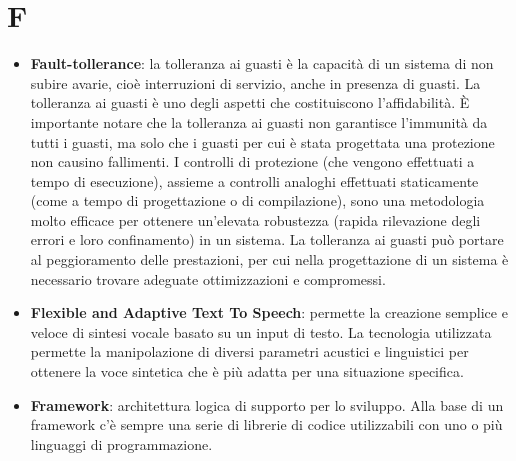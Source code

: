 \section{F}
\begin{itemize} 
	\item
	\textbf{Fault-tollerance}: la tolleranza ai guasti è la capacità di un sistema di non subire avarie, cioè interruzioni di servizio, anche in presenza di guasti. La tolleranza ai guasti è uno degli aspetti che costituiscono l'affidabilità. È importante notare che la tolleranza ai guasti non garantisce l'immunità da tutti i guasti, ma solo che i guasti per cui è stata progettata una protezione non causino fallimenti.
	I controlli di protezione (che vengono effettuati a tempo di esecuzione), assieme a controlli analoghi effettuati staticamente (come a tempo di progettazione o di compilazione), sono una metodologia molto efficace per ottenere un'elevata robustezza (rapida rilevazione degli errori e loro confinamento) in un sistema.
	La tolleranza ai guasti può portare al peggioramento delle prestazioni, per cui nella progettazione di un sistema è necessario trovare adeguate ottimizzazioni e compromessi.
	\item
	\textbf{Flexible and Adaptive Text To Speech}: permette la creazione semplice e veloce di sintesi vocale basato su un input di testo. La tecnologia utilizzata permette la manipolazione di diversi parametri acustici e linguistici per ottenere la voce sintetica che è più adatta per una situazione specifica. 
	\item
	\textbf{Framework}: architettura logica di supporto per lo sviluppo. Alla base di un framework c’è sempre una serie di librerie di codice utilizzabili con uno o più linguaggi di programmazione.
\end{itemize}